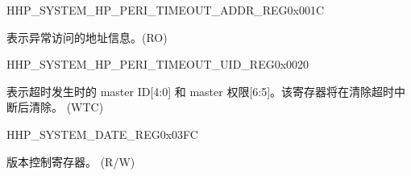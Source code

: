 \begin{register}{H}{HP\_SYSTEM\_HP\_PERI\_TIMEOUT\_ADDR\_REG}{0x001C}\label{regdesc:HPSYSTEMHPPERITIMEOUTADDRREG}
%
\regnewline%
\begin{regdesc}\begin{reglist}
\label{fielddesc:HPSYSTEMHPPERITIMEOUTADDR}\item [HP\_SYSTEM\_HP\_PERI\_TIMEOUT\_ADDR] 表示异常访问的地址信息。(RO)
\end{reglist}\end{regdesc}
\end{register}


\begin{register}{H}{HP\_SYSTEM\_HP\_PERI\_TIMEOUT\_UID\_REG}{0x0020}\label{regdesc:HPSYSTEMHPPERITIMEOUTUIDREG}
%
%
\regnewline%
\begin{regdesc}\begin{reglist}
\label{fielddesc:HPSYSTEMHPPERITIMEOUTUID}\item [HP\_SYSTEM\_HP\_PERI\_TIMEOUT\_UID] 表示超时发生时的 master  ID[4:0] 和 master 权限[6:5]。该寄存器将在清除超时中断后清除。 (WTC)
\end{reglist}\end{regdesc}
\end{register}


\begin{register}{H}{HP\_SYSTEM\_DATE\_REG}{0x03FC}\label{regdesc:HPSYSTEMDATEREG}
%
%
\regnewline%
\begin{regdesc}\begin{reglist}
\label{fielddesc:HPSYSTEMDATE}\item [HP\_SYSTEM\_DATE] 版本控制寄存器。 (R/W)
\end{reglist}\end{regdesc}
\end{register}
